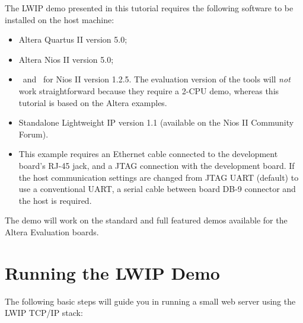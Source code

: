 The LWIP demo presented in this tutorial requires the following
software to be installed on the host machine:

\begin{itemize}
\item Altera Quartus II version 5.0;
\item Altera Nios II version 5.0;
\item \rtd\ and \ee\ for Nios II version 1.2.5. The evaluation version
  of the tools will {\em not} work straightforward because they
  require a 2-CPU demo, whereas this tutorial is based on the
   Altera examples.
\item Standalone Lightweight IP version 1.1 (available on the Nios II
  Community Forum).
\item This example requires an Ethernet cable connected to the
  development board's RJ-45 jack, and a JTAG connection with the
  development board. If the host communication settings are changed
  from JTAG UART (default) to use a conventional UART, a serial cable
  between board DB-9 connector and the host is required.

\end{itemize}

The demo will work on the standard and full featured demos available
for the Altera Evaluation boards.


\chapter{Running the LWIP Demo\label{cha:Running-the-demo}}

The following basic steps will guide you in running a small web server
using the LWIP TCP/IP stack:

